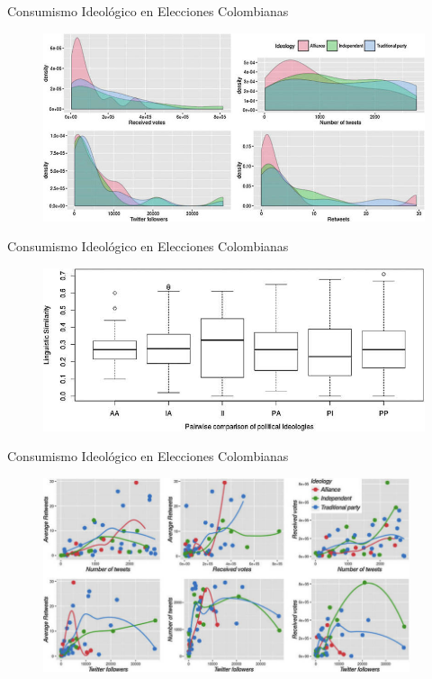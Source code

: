 \documentclass{beamer}
\begin{document}
\begin{frame}{Consumismo Ideológico en Elecciones Colombianas}
\begin{figure}
\centering
 \includegraphics[width=1\textwidth]{results2}
 \end{figure}
\end{frame}

\begin{frame}{Consumismo Ideológico en Elecciones Colombianas}
\begin{figure}
\centering
 \includegraphics[width=1\textwidth]{R1}
 \end{figure}
\end{frame}


\begin{frame}{Consumismo Ideológico en Elecciones Colombianas}
\begin{figure}
\centering
 \includegraphics[width=0.96\textwidth]{R3}
 \end{figure}
\end{frame}
\end{document}
